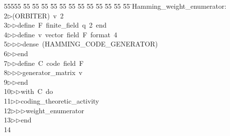 %
%
\begin{tabbing}
55555 \= 55 \= 55 \= 55 \= 55 \= 55 \= 55 \= 55 \= 55 \= 55 \= 55 \= 55 \= 55 \= \>Hamming\_weight\_enumerator:\\[0pt]
2\>$\triangleright$\>(ORBITER)\ v\ 2\ \\[0pt]
3\>$\triangleright$\>$\triangleright$\>define\ F\ finite\_field\ q\ 2\ end\ \\[0pt]
4\>$\triangleright$\>$\triangleright$\>define\ v\ vector\ field\ F\ format\ 4\ \\[0pt]
5\>$\triangleright$\>$\triangleright$\>$\triangleright$\>dense\ (HAMMING\_CODE\_GENERATOR)\ \\[0pt]
6\>$\triangleright$\>$\triangleright$\>end\ \\[0pt]
7\>$\triangleright$\>$\triangleright$\>define\ C\ code\ field\ F\ \\[0pt]
8\>$\triangleright$\>$\triangleright$\>$\triangleright$\>generator\_matrix\ v\ \\[0pt]
9\>$\triangleright$\>$\triangleright$\>end\ \\[0pt]
10\>$\triangleright$\>$\triangleright$\>with\ C\ do\ \\[0pt]
11\>$\triangleright$\>$\triangleright$\>coding\_theoretic\_activity\ \\[0pt]
12\>$\triangleright$\>$\triangleright$\>$\triangleright$\>weight\_enumerator\ \\[0pt]
13\>$\triangleright$\>$\triangleright$\>end\\[0pt]
14\>\end{tabbing}
